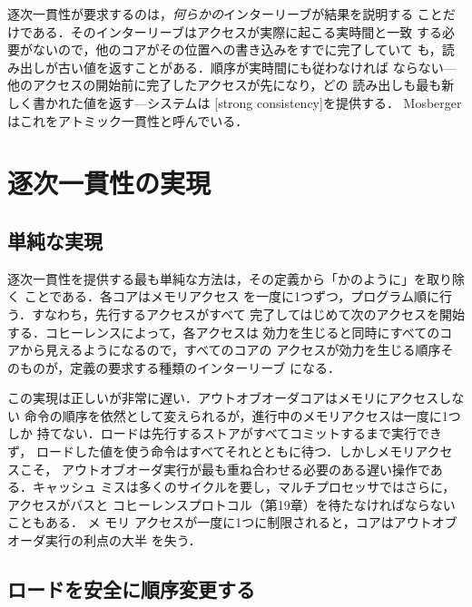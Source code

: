 \documentclass[../main.tex]{subfiles}
\begin{document}
\begin{note}[強い一貫性]
  逐次一貫性が要求するのは，\emph{何らかの}インターリーブが結果を説明する
  ことだけである．そのインターリーブはアクセスが実際に起こる実時間と一致
  する必要がないので，他のコアがその位置への書き込みをすでに完了していて
  も，読み出しが古い値を返すことがある．順序が実時間にも従わなければ
  ならない---他のアクセスの開始前に完了したアクセスが先になり，どの
  読み出しも最も新しく書かれた値を返す---システムは
  [strong consistency]を提供する．
  Mosberger \cite{mosberger1993} はこれをアトミック一貫性と呼んでいる．
\end{note}

\section{逐次一貫性の実現}
\label{sec:l21-implementing}

\subsection{単純な実現}

逐次一貫性を提供する最も単純な方法は，その定義から「かのように」を取り除く
ことである．各コアはメモリアクセス
を一度に1つずつ，プログラム順に行う．すなわち，先行するアクセスがすべて
完了してはじめて次のアクセスを開始する．コヒーレンスによって，各アクセスは
効力を生じると同時にすべてのコアから見えるようになるので，すべてのコアの
アクセスが効力を生じる順序そのものが，定義の要求する種類のインターリーブ
になる．

この実現は正しいが非常に遅い．アウトオブオーダコアはメモリにアクセスしない
命令の順序を依然として変えられるが，進行中のメモリアクセスは一度に1つしか
持てない．ロードは先行するストアがすべてコミットするまで実行できず，
ロードした値を使う命令はすべてそれとともに待つ．しかしメモリアクセスこそ，
アウトオブオーダ実行が最も重ね合わせる必要のある遅い操作である．キャッシュ
ミスは多くのサイクルを要し，マルチプロセッサではさらに，アクセスがバスと
コヒーレンスプロトコル（第19章）を待たなければならないこともある．
メ
モリ
アクセスが一度に1つに制限されると，コアはアウトオブオーダ実行の利点の大半
を失う．

\subsection{ロードを安全に順序変更する}
\end{document}
